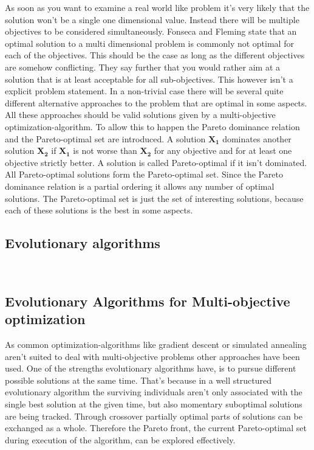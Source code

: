 \documentclass[12pt,twoside]{article}
\theoremstyle{plain}
\theoremstyle{definition}
\theoremstyle{remark}
\begin{document}
As soon as you want to examine a real world like problem it's very likely that the solution won't be a single one dimensional value. Instead there will be multiple objectives to be considered simultaneously.
Fonseca and Fleming \cite{fonseca1995overview} state that an optimal solution to a multi dimensional problem is commonly not optimal for each of the objectives.
This should be the case as long as the different objectives are somehow conflicting.
They say further that you would rather aim at a solution that is at least acceptable for all sub-objectives.
This however isn't a explicit problem statement. In a non-trivial case there will be several quite different alternative approaches to the problem that are optimal in some aspects.
All these approaches should be valid solutions given by a multi-objective optimization-algorithm.
To allow this to happen the Pareto dominance relation and the Pareto-optimal set are introduced.
A solution $\mathbf{X_1}$ dominates another solution $\mathbf{X_2}$ if $\mathbf{X_1}$ is not worse than $\mathbf{X_2}$ for any objective and for at least one objective strictly better. \cite{doncieux2015multi} 
A solution is called Pareto-optimal if it isn't dominated. All Pareto-optimal solutions form the Pareto-optimal set. 
Since the Pareto dominance relation is a partial ordering it allows any number of optimal solutions.
The Pareto-optimal set is just the set of interesting solutions, because each of these solutions is the best in some aspects.

\subsection{Evolutionary algorithms}
\label{back:evo}
\cite{eiben2004introduction}\\

\subsection{Evolutionary Algorithms for Multi-objective optimization}
\label{back:evo_in_multi-opt}
As common optimization-algorithms like gradient descent or simulated annealing aren't suited to deal with multi-objective problems \cite{fonseca1995overview} other approaches have been used.
One of the strengths evolutionary algorithms have, is to pursue different possible solutions at the same time. That's because in a well structured evolutionary algorithm the surviving individuals aren't only associated with the single best solution at the given time, but also momentary suboptimal solutions are being tracked.
Through crossover partially optimal parts of solutions can be exchanged as a whole. 
Therefore the Pareto front, the current Pareto-optimal set during execution of the algorithm, can be explored effectively.
\end{document}
